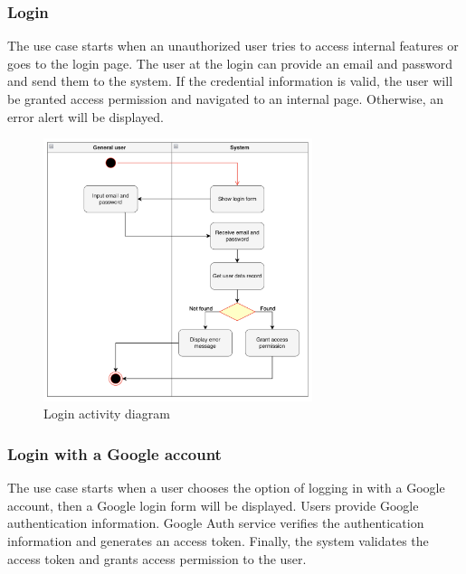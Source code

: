 \subsubsection{Login}

The use case starts when an unauthorized user tries to access internal features or goes to the login page. The user at the login can provide an email and password and send them to the system. If the credential information is valid, the user will be granted access permission and navigated to an internal page. Otherwise, an error alert will be displayed.

\begin{figure}[H]
  \centering
  \includegraphics[width=0.7\textwidth]{Figures/login.png}
  \caption{Login activity diagram}
  \label{fig:login}
\end{figure}

\subsubsection{Login with a Google account}

The use case starts when a user chooses the option of logging in with a Google account, then a Google login form will be displayed. Users provide Google authentication information. Google Auth service verifies the authentication information and generates an access token. Finally, the system validates the access token and grants access permission to the user.

